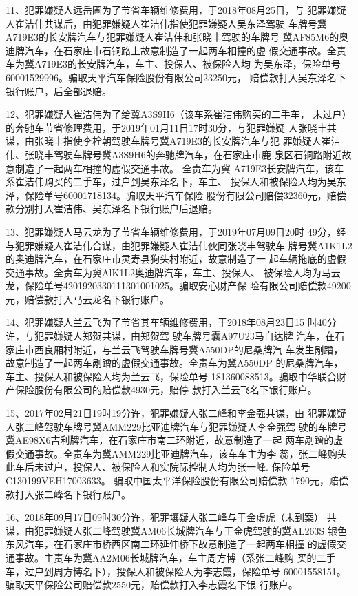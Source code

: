 11、犯罪嫌疑人远岳圃为了节省车辆维修费用，于2018年08月25日，与
犯罪嫌疑人崔洁伟共谋后，由犯罪嫌疑人崔洁伟指使犯罪嫌疑人吴东泽驾驶
车牌号冀A719E3的长安牌汽车与犯罪嫌疑人崔洁伟和张晓丰驾驶的车牌号
冀AF85M6的奥迪牌汽车，在石家庄市石铜路上故意制造了一起两车相撞的虚
假交通事故。全责车为冀A719E3的长安牌汽车，车主、投保人、被保险人均
为吴东泽，保险单号60001529996。骗取天平汽车保险股份有限公司23250元，
赔偿款打入吴东泽名下银行账户，后全部退赔。

12、犯罪嫌疑人崔洁伟为了给冀A3S9H6（该车系崔洁伟购买的二手车，
未过户）的奔驰车节省修理费用，于2019年01月11日17时30分，与犯罪嫌疑
人张晓丰共谋，由张晓丰指使李栓朝驾驶车牌号冀A719E3的长安牌汽车与犯
罪嫌疑人崔洁伟、张晓丰驾驶车牌号冀A3S9H6的奔驰牌汽车，在石家庄市鹿
泉区石铜路附近故意制造了一起两车相撞的虚假交通事故。 全责车为冀
A719E3长安牌汽车，该车系崔洁伟购买的二手车，过户到吴东泽名下，车主、
投保人和被保险人均为吴东泽，保险单号60001718134。骗取天平汽车保险
股份有限公司赔偿32360元，赔偿款分别打入崔洁伟、吴东泽名下银行账户后退赔。

13、犯罪嫌疑人马云龙为了节省车辆维修费用，于2019年07月09日20时
49分，经与犯罪嫌疑人崔洁伟合谋，由犯罪嫌疑人崔洁伟伙同张晓丰驾驶车
牌号冀A1K1L2的奥迪牌汽车，在石家庄市灵寿县狗头村附近，故意制造了一
起车辆拖底的虚假交通事故。全责车为冀AlK1L2奥迪牌汽车，车主、投保人、
被保险人均为马云龙，保险单号4201920330111301001025。骗取安心财产保
险有限公司赔偿款49200元，赔偿款打入马云龙名下银行账户。

14、犯罪嫌疑人兰云飞为了节省其车辆维修费用，于2018年08月23日15
时40分许，与犯罪嫌疑人郑贺共谋，由郑贺驾 驶车牌号囊A97U23马自达牌
汽车，在石家庄市西良厢村附近，与兰云飞驾驶车牌号冀A550DP的尼桑牌汽
车发生剐蹭，故意制造了一起两车剐蹭的虚假交通事故。全责车为冀A550DP
的尼桑牌汽车，车主、投保人和被保险人均为兰云飞，保险单号
181360088513。骗取中华联合财产保险股份有限公司的赔偿款4930元，赔停
款打入兰云飞名下银行账户。

15、2017年02月21日19时19分许，犯罪嫌疑人张二峰和李金强共谋，由
犯罪嫌疑人张二峰驾驶车牌号冀AMM229比亚迪牌汽车与犯罪嫌疑人李金强驾
驶的车牌号冀AE98X6吉利牌汽车，在石家庄市南二环附近，故意制造了一起
两车剐蹭的虚假交通事故。全责车为冀AMM229比亚迪牌汽车，该车车主为李
蕊，张二峰购头此车后未过户，投保人、被保险人和实院际控制人均为张一峰.
保险单号C130199VEH17003633。 骗取中国太平洋保险股份有限公司赔偿款
1790元，赔偿款打入张二峰名下银行账户。

16、2018年09月17日09时30分许，犯罪壤疑人张二峰与于金虚虎（未到案）
共谋，由犯罪嫌疑人张二峰驾驶冀AM06长城牌汽车与王金虎驾驶的冀AL263S
银色东风汽车，在石家庄市桥西区南二环延伸桥下故意制造了一起两车相撞
的虚假交通事故。主责车为冀AA2M06长城牌汽车，车主周方博（系张二峰购
买的二手车，过户到周方博名下），投保人和被保险人为李志霞，保险单号
60001558151。 骗取天平保险公司赔偿款2550元，赔偿款打入李志霞名下银
行账户。

